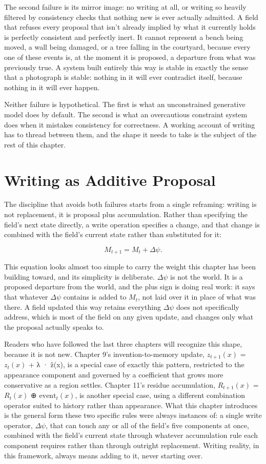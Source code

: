 The second failure is its mirror image: no writing at all, or writing so heavily filtered by consistency checks that nothing new is ever actually admitted. A field that refuses every proposal that isn't already implied by what it currently holds is perfectly consistent and perfectly inert. It cannot represent a bench being moved, a wall being damaged, or a tree falling in the courtyard, because every one of these events is, at the moment it is proposed, a departure from what was previously true. A system built entirely this way is stable in exactly the sense that a photograph is stable: nothing in it will ever contradict itself, because nothing in it will ever happen.

Neither failure is hypothetical. The first is what an unconstrained generative model does by default. The second is what an overcautious constraint system does when it mistakes consistency for correctness. A working account of writing has to thread between them, and the shape it needs to take is the subject of the rest of this chapter.

\section{Writing as Additive Proposal}

The discipline that avoids both failures starts from a single reframing: writing is not replacement, it is proposal plus accumulation. Rather than specifying the field's next state directly, a write operation specifies a change, and that change is combined with the field's current state rather than substituted for it:

\[ M_{t+1} = M_t + \Delta\psi. \]

This equation looks almost too simple to carry the weight this chapter has been building toward, and its simplicity is deliberate. \(\Delta\psi\) is not the world. It is a proposed departure from the world, and the plus sign is doing real work: it says that whatever \(\Delta\psi\) contains is added to \(M_t\), not laid over it in place of what was there. A field updated this way retains everything \(\Delta\psi\) does not specifically address, which is most of the field on any given update, and changes only what the proposal actually speaks to.

Readers who have followed the last three chapters will recognize this shape, because it is not new. Chapter 9's invention-to-memory update, \(z_{t+1}(x)\) = \(z_t(x)\) + λ · ẑ(x), is a special case of exactly this pattern, restricted to the appearance component and governed by a coefficient that grows more conservative as a region settles. Chapter 11's residue accumulation, \(R_{t+1}(x)\) = \(R_t(x)\) ⊕ \(\mathrm{event}_t(x)\), is another special case, using a different combination operator suited to history rather than appearance. What this chapter introduces is the general form these two specific rules were always instances of: a single write operator, \(\Delta\psi\), that can touch any or all of the field's five components at once, combined with the field's current state through whatever accumulation rule each component requires rather than through outright replacement. Writing reality, in this framework, always means adding to it, never starting over.

